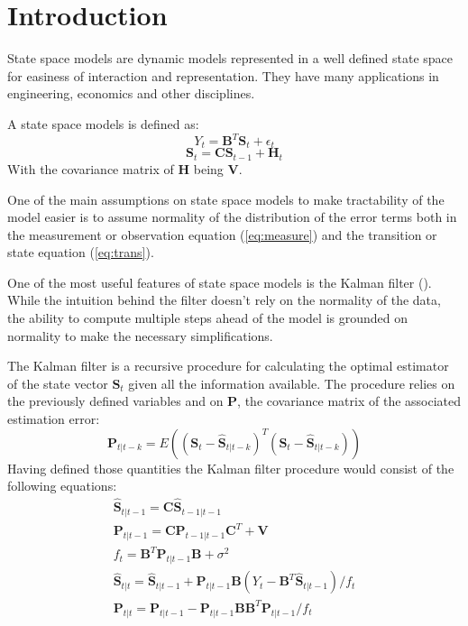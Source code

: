 \section{Introduction}
\justify
State space models are dynamic models represented in a well defined state space for easiness of interaction and representation. They have many applications in engineering, economics and other disciplines. 
\par \vspace{5mm}
A state space models is defined as:
\begin{equation} \label{eq:measure}
    Y_t = \textbf{B}^T \textbf{S}_t + \epsilon_t
\end{equation}
\begin{equation} \label{eq:trans}
    \textbf{S}_t =  \textbf{C}\textbf{S}_{t-1} + \textbf{H}_t
\end{equation}
With the covariance matrix of \textbf{H} being \textbf{V}.
\par \vspace{5mm}
One of the main assumptions on state space models to make tractability of the model easier is to assume normality of the distribution of the error terms both in the measurement or observation equation (\ref{eq:measure}) and the transition or state equation (\ref{eq:trans}).
\par \vspace{5mm}
One of the most useful features of state space models is the Kalman filter (\cite{kalman1960}). While the intuition behind the filter doesn't rely on the normality of the data, the ability to compute multiple steps ahead of the model is grounded on normality to make the necessary simplifications.
\par \vspace{5mm}
The Kalman filter is a recursive procedure for calculating the optimal estimator of the state vector $\textbf{S}_t$ given all the information available. The procedure relies on the previously defined variables and on \textbf{P}, the covariance matrix of the associated estimation error:
\begin{equation}
    \textbf{P}_{t|t-k} = E((\textbf{S}_t - \widehat{\textbf{S}}_{t|t-k})^T(\textbf{S}_t - \widehat{\textbf{S}}_{t|t-k}))
\end{equation}
Having defined those quantities the Kalman filter procedure would consist of the following equations:
\begin{equation}
  \label{eq:kalman}
  \begin{gathered}
    \widehat{\textbf{S}}_{t|t-1} = \textbf{C}\widehat{\textbf{S}}_{t-1|t-1}\\
    \textbf{P}_{t|t-1} =  \textbf{C}\textbf{P}_{t-1|t-1}\textbf{C}^T + \textbf{V}\\
    f_t = \textbf{B}^T\textbf{P}_{t|t-1}\textbf{B} + \sigma^2\\
    \widehat{\textbf{S}}_{t|t} = \widehat{\textbf{S}}_{t|t-1} + \textbf{P}_{t|t-1}
    \textbf{B}(Y_t - \textbf{B}^T\widehat{\textbf{S}}_{t|t-1})/f_t\\
    \textbf{P}_{t|t} =  \textbf{P}_{t|t-1} -  \textbf{P}_{t|t-1}\textbf{B}\textbf{B}^T \textbf{P}_{t|t-1} /f_t
  \end{gathered}
\end{equation}
